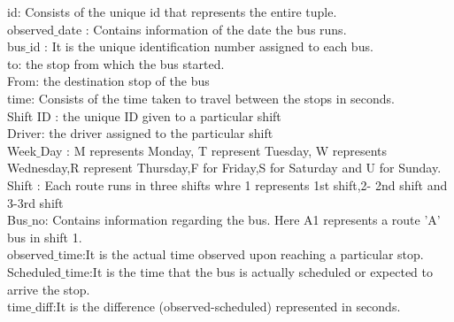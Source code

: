 \documentclass[12pt]{article}
\begin{document}
\begin{enumerate}
	id: Consists of the unique id that represents the entire tuple.
	\\observed$\_ $date : Contains information of the date the bus runs.
	\\bus$\_ $id : It is the unique identification number assigned  to each bus.\\
	to: the stop from which the bus started.\\
	From: the destination stop of the bus \\
	time: Consists of the time taken to travel between the stops in seconds. \\
	Shift ID : the unique ID given to a particular shift \\
	Driver: the driver assigned to the particular shift \\
	Week$\_ $Day : M represents Monday, T represent Tuesday, W represents \\ Wednesday,R represent Thursday,F for Friday,S for Saturday and U for Sunday. \\
	Shift : Each route runs in three shifts whre 1 represents 1st shift,2- 2nd shift and 3-3rd shift\\
	Bus$\_ $no: Contains information regarding the bus. Here A1 represents a route 'A' bus in shift 1.\\
	observed$\_ $time:It is the actual time observed upon reaching a particular stop.\\
	Scheduled$\_ $time:It is the time that the bus is actually scheduled or expected to arrive the stop.\\
	time$\_ $diff:It is the difference (observed-scheduled) represented in seconds.
	
\end{enumerate}
\end{document}
